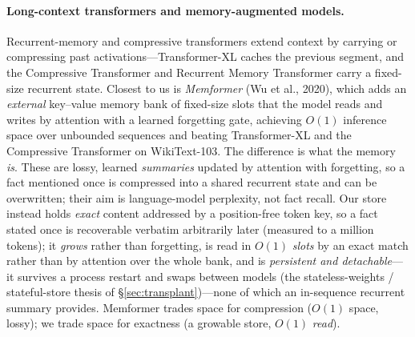 \paragraph{Long-context transformers and memory-augmented models.} Recurrent-memory
and compressive transformers extend context by carrying or compressing past
activations---Transformer-XL caches the previous segment, and the Compressive
Transformer and Recurrent Memory Transformer carry a fixed-size recurrent state.
Closest to us is \emph{Memformer} (Wu et al., 2020), which adds an \emph{external}
key--value memory bank of fixed-size slots that the model reads and writes by
attention with a learned forgetting gate, achieving $O(1)$ inference space over
unbounded sequences and beating Transformer-XL and the Compressive Transformer on
WikiText-103. The difference is what the memory \emph{is}. These are lossy, learned
\emph{summaries} updated by attention with forgetting, so a fact mentioned once is
compressed into a shared recurrent state and can be overwritten; their aim is
language-model perplexity, not fact recall. Our store instead holds \emph{exact}
content addressed by a position-free token key, so a fact stated once is recoverable
verbatim arbitrarily later (measured to a million tokens); it \emph{grows} rather
than forgetting, is read in $O(1)$ \emph{slots} by an exact match rather than by
attention over the whole bank, and is \emph{persistent and detachable}---it survives
a process restart and swaps between models (the stateless-weights / stateful-store
thesis of \S\ref{sec:transplant})---none of which an in-sequence recurrent summary
provides. Memformer trades space for compression ($O(1)$ space, lossy); we trade
space for exactness (a growable store, $O(1)$ \emph{read}).

